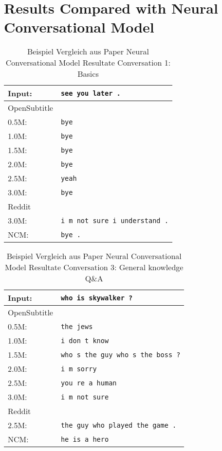 \chapter{Results Compared with Neural Conversational Model}
\label{apendix:results:compared_with_NCM}
\begin{table}[H]
	\centering
	\begin{adjustbox}{max width=\textwidth}
		\begin{tabular}{ll}
			\toprule
			Input: 	& \texttt{see you later .}\\
			\midrule
			OpenSubtitle\\
			0.5M: 	& \texttt{bye}\\
			1.0M: 	& \texttt{bye}\\
			1.5M:	& \texttt{bye}\\
			2.0M:	& \texttt{bye}\\
			2.5M:	& \texttt{yeah}\\
			3.0M:	& \texttt{bye}\\
			\midrule
			Reddit\\
			3.0M:	& \texttt{i m not sure i understand .}\\
			\midrule
			NCM:	& \texttt{bye .}\\
			\bottomrule
		\end{tabular}
	\end{adjustbox}
	\caption{Beispiel Vergleich aus Paper Neural Conversational Model Resultate Conversation 1: Basics}
	\label{results:example15_output: Neural_Conversational_Model_compared}
\end{table}

\begin{table}[H]
	\centering
	\begin{adjustbox}{max width=\textwidth}
		\begin{tabular}{ll}
			\toprule
			Input: 	& \texttt{who is skywalker ?}\\
			\midrule
			OpenSubtitle\\
			0.5M: 	& \texttt{the jews}\\
			1.0M: 	& \texttt{i don t know}\\
			1.5M:	& \texttt{who s the guy who s the boss ?}\\
			2.0M:	& \texttt{i m sorry}\\
			2.5M:	& \texttt{you re a human}\\
			3.0M:	& \texttt{i m not sure}\\
			\midrule
			Reddit\\
			2.5M:	& \texttt{the guy who played the game .}\\
			\midrule
			NCM:	& \texttt{he is a hero }\\
			\bottomrule
		\end{tabular}
	\end{adjustbox}
	\caption{Beispiel Vergleich aus Paper Neural Conversational Model Resultate Conversation 3: General knowledge Q\&A}
	\label{results:example16_output: Neural_Conversational_Model_compared}
\end{table}

